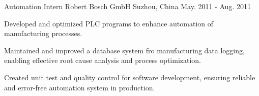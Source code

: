 \begin{cventries}
	\cventry
		{Automation Intern} %
		{Robert Bosch GmbH} %
		{Suzhou, China} %
		{May. 2011 - Aug. 2011} %
		{
			\begin{cvitems} %
				\item {Developed and optimized PLC programs to enhance automation of %
				manufacturing processes}.
				\item {Maintained and improved a database system fro manufacturing data %
				logging, enabling effective root cause analysis and process optimization.}
				\item {Created unit test and quality control for software development, %
				ensuring reliable and error-free automation system in production.}
			\end{cvitems}
		}

\end{cventries}
